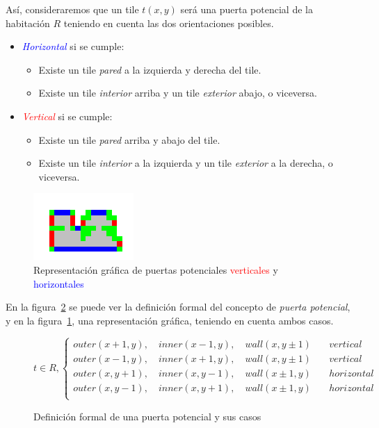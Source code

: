Así, consideraremos que un tile $t(x,y)$ será una puerta potencial de la habitación $R$ teniendo en cuenta las dos orientaciones posibles. 

\begin{itemize}
	\item \textcolor{blue}{\emph{Horizontal}} si se cumple:
	\begin{itemize}
		\item Existe un tile \emph{pared} a la izquierda y derecha del tile.
		\item Existe un tile \emph{interior} arriba y un tile \emph{exterior} abajo, o viceversa.
	\end{itemize}
	\item \textcolor{red}{\emph{Vertical}} si se cumple:
	\begin{itemize}
		\item Existe un tile \emph{pared} arriba y abajo del tile.
		\item Existe un tile \emph{interior} a la izquierda y un tile \emph{exterior} a la derecha, o viceversa.
	\end{itemize}
\end{itemize}

\begin{figure}[t]
\centering
\includegraphics[scale=1]{img/ppot}
\caption{Representación gráfica de puertas potenciales \textcolor{red}{verticales} y \textcolor{blue}{horizontales}
\label{fig:grafpp}}
\end{figure}

En la figura~\ref{fig:formpp} se puede ver la definición formal del concepto de \emph{puerta potencial}, y en la figura~\ref{fig:grafpp}, una representación gráfica, teniendo en cuenta ambos casos.

\begin{figure}[h]
\centering
{
$$
t \in R, \begin{cases}
	outer(x+1,y), \quad inner(x-1,y), \quad wall(x, y\pm1) & \quad vertical \\
	outer(x-1,y), \quad inner(x+1,y), \quad wall(x, y\pm1) & \quad vertical\\
	outer(x,y+1), \quad inner(x,y-1), \quad wall(x\pm1, y) & \quad horizontal\\
	outer(x,y-1), \quad inner(x,y+1), \quad wall(x\pm1, y) & \quad horizontal\\
\end{cases}
$$

}
\caption{Definición formal de una puerta potencial y sus casos
\label{fig:formpp}
}
\end{figure}


